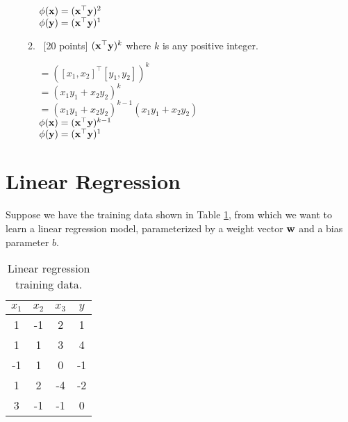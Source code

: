 \documentclass[12pt, fullpage,letterpaper]{article}
\begin{document}
\begin{enumerate}
\begin{enumerate}
    $\phi({\bf x}) = ({\bf x}^{\top}{\bf y})^2$\\
    $\phi({\bf y}) = ({\bf x}^{\top}{\bf y})^1$

\item~[20 points] $({\bf x}^\top {\bf y})^k$ where $k$ is  any positive integer.

    $= ([x_1, x_2]^\top[y_1, y_2])^k$\\
    $= (x_1y_1 + x_2y_2)^k$\\
    $= (x_1y_1 + x_2y_2)^{k-1}(x_1y_1 + x_2y_2) $\\

    $\phi({\bf x}) = ({\bf x}^{\top}{\bf y})^{k-1}$\\
    $\phi({\bf y}) = ({\bf x}^{\top}{\bf y})^1$

\end{enumerate}
\end{enumerate}

\section{Linear Regression}
Suppose we have the training data shown in Table \ref{tb:1}, from which we want to learn a linear regression model, parameterized by a weight vector ${\bf w}$ and a bias parameter $b$.  
\begin{table}
        \centering
        \begin{tabular}{ccc|c}
        $x_1 $ & $x_2$ & $x_3$ &  $y$\\ 
        \hline\hline
         1 & -1 & 2 & 1 \\ \hline
         1 & 1 & 3 & 4 \\ \hline
         -1 & 1 & 0 & -1 \\ \hline
         1 & 2 & -4 & -2 \\ \hline
         3 & -1 & -1 & 0\\ \hline
         \end{tabular}
         \caption{Linear regression training data.}\label{tb:1}
\end{table}
\end{document}
